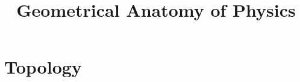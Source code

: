 \documentclass[a4paper]{article}
\title{Geometrical Anatomy of Physics}
\theoremstyle{definition} %
\theoremstyle{plain} %
\theoremstyle{remark} %
\begin{document}
    \maketitle
    \tableofcontents
    \newpage

    \section{Topology}
    
\end{document}
